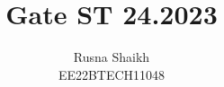 \documentclass{article}[]
\begin{document}
\title{Gate ST 24.2023}
\author{Rusna Shaikh\\EE22BTECH11048}
\date{}
\maketitle{}
\providecommand{\pr}[1]{\ensuremath{\Pr\left(#1\right)}}
\providecommand{\prt}[2]{\ensuremath{p_{#1}^{\left(#2\right)} }}        %
\providecommand{\qfunc}[1]{\ensuremath{Q\left(#1\right)}}
\providecommand{\sbrak}[1]{\ensuremath{{}\left[#1\right]}}
\providecommand{\lsbrak}[1]{\ensuremath{{}\left[#1\right.}}
\providecommand{\rsbrak}[1]{\ensuremath{{}\left.#1\right]}}
\providecommand{\brak}[1]{\ensuremath{\left(#1\right)}}
\providecommand{\lbrak}[1]{\ensuremath{\left(#1\right.}}
\providecommand{\rbrak}[1]{\ensuremath{\left.#1\right)}}
\providecommand{\cbrak}[1]{\ensuremath{\left\{#1\right\}}}
\providecommand{\lcbrak}[1]{\ensuremath{\left\{#1\right.}}
\providecommand{\rcbrak}[1]{\ensuremath{\left.#1\right\}}}
\newcommand{\sgn}{\mathop{\mathrm{sgn}}}
\providecommand{\abs}[1]{\left\vert#1\right\vert}
\providecommand{\res}[1]{\Res\displaylimits_{#1}} 
\providecommand{\norm}[1]{\left\lVert#1\right\rVert}
\providecommand{\mtx}[1]{\mathbf{#1}}
\providecommand{\mean}[1]{E\left[ #1 \right]}
\providecommand{\cond}[2]{#1\middle|#2}
\providecommand{\fourier}{\overset{\mathcal{F}}{ \rightleftharpoons}}
\newenvironment{amatrix}[1]{%
  \left(\begin{array}{@{}*{#1}{c}|c@{}}
}{%
  \end{array}\right)
}
\newcommand{\solution}{\noindent \textbf{Solution: }}
\newcommand{\cosec}{\,\text{cosec}\,}
\providecommand{\dec}[2]{\ensuremath{\overset{#1}{\underset{#2}{\gtrless}}}}
\newcommand{\myvec}[1]{\ensuremath{\begin{pmatrix}#1\end{pmatrix}}}
\newcommand{\mydet}[1]{\ensuremath{\begin{vmatrix}#1\end{vmatrix}}}
\newcommand{\myaugvec}[2]{\ensuremath{\begin{amatrix}{#1}#2\end{amatrix}}}
\providecommand{\rank}{\text{rank}}
\providecommand{\pr}[1]{\ensuremath{\Pr\left(#1\right)}}
\providecommand{\qfunc}[1]{\ensuremath{Q\left(#1\right)}}
\end{document}
